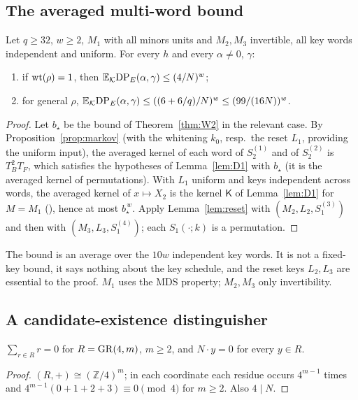 \subsection{The averaged multi-word bound}
\begin{theorem}\label{thm:P4}
Let $q\ge32$, $w\ge2$, $M_1$ with all minors units and $M_2,M_3$ invertible, all key words
independent and uniform. For every $h$ and every $\alpha\ne0$, $\gamma$:
\begin{enumerate}
\item if $\mathrm{wt}(\rho)=1$, then $\mathbb{E}_{\mathcal{K}}\mathrm{DP}_E(\alpha,\gamma)\le(4/N)^w$;
\item for general $\rho$, $\mathbb{E}_{\mathcal{K}}\mathrm{DP}_E(\alpha,\gamma)\le((6+6/q)/N)^w\le(99/(16N))^w$.
\end{enumerate}
\end{theorem}
\begin{proof}
Let $b_\star$ be the bound of Theorem~\ref{thm:W2} in the relevant case. By Proposition~\ref{prop:markov}
(with the whitening $k_0$, resp.\ the reset $L_1$, providing the uniform input), the averaged kernel of
each word of $S_2^{(1)}$ and of $S_2^{(2)}$ is $T_B^2T_F$, which satisfies the hypotheses of
Lemma~\ref{lem:D1} with $b_\star$ (it is the averaged kernel of permutations). With $L_1$ uniform and keys
independent across words, the averaged kernel of $x\mapsto X_2$ is the kernel $\mathsf K$ of Lemma~\ref{lem:D1}
for $M=M_1$ (\cite{Hong,Park}), hence at most $b_\star^{\,w}$. Apply Lemma~\ref{lem:reset} with
$(M_2,L_2,S_1^{(3)})$ and then with $(M_3,L_3,S_1^{(4)})$; each $S_1(\cdot;k)$ is a permutation.
\end{proof}

\begin{remark}
The bound is an average over the $10w$ independent key words. It is not a fixed-key bound, it says
nothing about the key schedule, and the reset keys $L_2,L_3$ are essential to the proof. $M_1$ uses the
MDS property; $M_2,M_3$ only invertibility.
\end{remark}

\subsection{A candidate-existence distinguisher}
\begin{lemma}\label{lem:sumR}
$\sum_{r\in R}r=0$ for $R=\mathrm{GR}(4,m)$, $m\ge2$, and $N\cdot y=0$ for every $y\in R$.
\end{lemma}
\begin{proof}
$(R,+)\cong(\mathbb Z/4)^m$; in each coordinate each residue occurs $4^{m-1}$ times and
$4^{m-1}(0+1+2+3)\equiv0\pmod4$ for $m\ge2$. Also $4\mid N$.
\end{proof}

